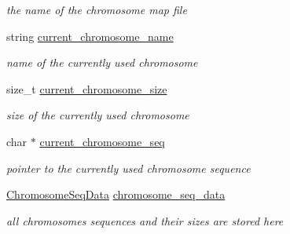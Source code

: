 \begin{CompactItemize}
\begin{CompactList}\small\item\em the name of the chromosome map file \item\end{CompactList}\item 
\hypertarget{classChromosomes_b3b502eec7bd2028297300aeb47b5844}{
string \hyperlink{classChromosomes_b3b502eec7bd2028297300aeb47b5844}{current\_\-chromosome\_\-name}}
\label{classChromosomes_b3b502eec7bd2028297300aeb47b5844}

\begin{CompactList}\small\item\em name of the currently used chromosome \item\end{CompactList}\item 
\hypertarget{classChromosomes_fb59cb80755187f4546573f10110e669}{
size\_\-t \hyperlink{classChromosomes_fb59cb80755187f4546573f10110e669}{current\_\-chromosome\_\-size}}
\label{classChromosomes_fb59cb80755187f4546573f10110e669}

\begin{CompactList}\small\item\em size of the currently used chromosome \item\end{CompactList}\item 
\hypertarget{classChromosomes_f640cf0f09b109b3d46d70aba9207a2e}{
char $\ast$ \hyperlink{classChromosomes_f640cf0f09b109b3d46d70aba9207a2e}{current\_\-chromosome\_\-seq}}
\label{classChromosomes_f640cf0f09b109b3d46d70aba9207a2e}

\begin{CompactList}\small\item\em pointer to the currently used chromosome sequence \item\end{CompactList}\item 
\hypertarget{classChromosomes_673169d55aa0b94815e17b41566d4d8c}{
\hyperlink{classChromosomes_4a233d2b7fabc1a589cbbafd5d0ea243}{ChromosomeSeqData} \hyperlink{classChromosomes_673169d55aa0b94815e17b41566d4d8c}{chromosome\_\-seq\_\-data}}
\label{classChromosomes_673169d55aa0b94815e17b41566d4d8c}

\begin{CompactList}\small\item\em all chromosomes sequences and their sizes are stored here \item\end{CompactList}\end{CompactItemize}


